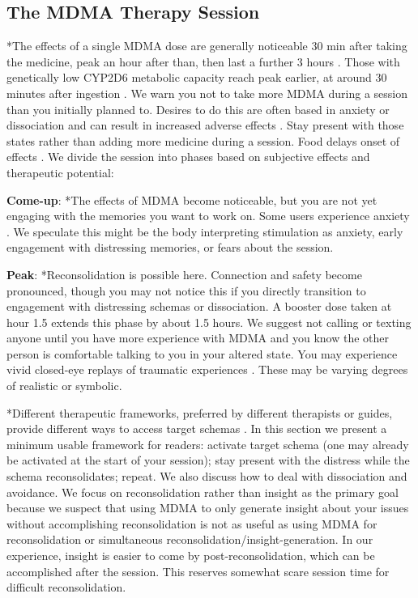 \documentclass[12pt,letterpaper]{article}
\begin{document}
\subsection{The MDMA Therapy Session}
\label{session}
*The effects of a single MDMA dose are generally noticeable 30 min after taking the medicine, peak an hour after than, then last a further 3 hours \cite{vizeliActuteEffects}. Those with genetically low CYP2D6 metabolic capacity reach peak earlier, at around 30 minutes after ingestion \cite{schmid2016cyp2d6}. We warn you not to take more MDMA during a session than you initially planned to. Desires to do this are often based in anxiety or dissociation and can result in increased adverse effects \cite{bruntLinking}. Stay present with those states rather than adding more medicine during a session. Food delays onset of effects \cite{MithoeferMDMA}. We divide the session into phases based on subjective effects and therapeutic potential:

\textbf{Come-up}:
*The effects of MDMA become noticeable, but you are not yet engaging with the memories you want to work on. Some users experience anxiety \cite{hillsSolo}. We speculate this might be the body interpreting stimulation as anxiety, early engagement with distressing memories, or fears about the session.

\textbf{Peak}:
*Reconsolidation is possible here. Connection and safety become pronounced, though you may not notice this if you directly transition to engagement with distressing schemas or dissociation. A booster dose taken at hour 1.5 extends this phase by about 1.5 hours. We suggest not calling or texting anyone until you have more experience with MDMA and you know the other person is comfortable talking to you in your altered state. You may experience vivid closed-eye replays of traumatic experiences \cite{liechtiGender}. These may be varying degrees of realistic or symbolic.

*Different therapeutic frameworks, preferred by different therapists or guides, provide different ways to access target schemas \cite{eckerUnlocking}. In this section we present a minimum usable framework for readers: activate target schema (one may already be activated at the start of your session); stay present with the distress while the schema reconsolidates; repeat. We also discuss how to deal with dissociation and avoidance. We focus on reconsolidation rather than insight as the primary goal because we suspect that using MDMA to only generate insight about your issues without accomplishing reconsolidation is not as useful as using MDMA for reconsolidation or simultaneous reconsolidation/insight-generation. In our experience, insight is easier to come by post-reconsolidation, which can be accomplished after the session. This reserves somewhat scare session time for difficult reconsolidation.
\end{document}
